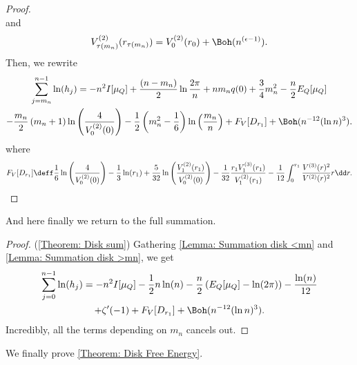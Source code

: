\begin{proof}
\begin{equation}
	\end{equation}
	and
	\begin{equation}
		V^{(2)}_{\tau(m_n)}(r_{\tau(m_n)}) = V^{(2)}_0(r_0) + \Boh(n^{(\epsilon-1)}).
	\end{equation}
	Then, we rewrite
	\begin{multline}
				\sum_{j=m_n}^{n-1} \ln (h_j) = -n^2 I[\mu_Q] + \frac{(n-m_n)}{2} \ln{\frac{2\pi}{n}} +  n m_n q(0) + \frac{3}{4} m_n^2 - \frac{n}{2} E_Q[\mu_Q] \\ - \frac{m_n}{2} \left(m_n + 1\right) \ln{\left(\frac{4}{V^{(2)}_0(0)}\right)} - \frac{1}{2} \left( m_n^2 - \frac{1}{6} \right) \ln{\left(\frac{m_n}{n}\right)} + F_V[D_{r_1}] + \Boh(n^{-12} (\ln n)^3).
	\end{multline}
	where
	\begin{equation}
		 F_V[D_{r_1}] \deff \frac{1}{6} \ln{\left(\frac{4}{V^{(2)}_0(0)}\right)} - \frac{1}{3} \ln(r_1) + \frac{5}{32} \ln\left( \frac{V^{(2)}_1(r_1)}{V^{(2)}_{0}(0)} \right) - \frac{1}{32} \frac{r_1  V^{(3)}_1(r_1)}{V^{(2)}_1(r_1)} - \frac{1}{12} \int_{0}^{r_1} \frac{V^{(3)}(r)^2}{V^{(2)}(r)^{2}} r \dd r.
	\end{equation}
\end{proof}

And here finally we return to the full summation.

\begin{proof} (\autoref{Theorem: Disk sum})
	Gathering \autoref{Lemma: Summation disk <mn} and \autoref{Lemma: Summation disk >mn}, we get
	\begin{multline}
		\sum_{j=0}^{n-1} \ln (h_j) = -n^2 I[\mu_Q] - \frac{1}{2} n \ln(n)  -\frac{n}{2} \left( E_Q[\mu_Q] - \ln(2\pi) \right) - \frac{\ln(n)}{12} \\ + \zeta'(-1) + F_V[D_{r_1}] + \Boh(n^{-12} (\ln n)^3).
	\end{multline}
	Incredibly, all the terms depending on $m_n$ cancels out.
\end{proof}


We finally prove \autoref{Theorem: Disk Free Energy}.

